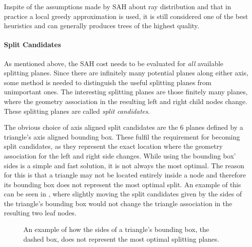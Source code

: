 Inspite of the assumptions made by SAH about ray distribution and that in
practice a local greedy approximation is used, it is still considered one of the
best heuristics and can generally produces trees of the highest quality.



\paragraph{Split Candidates}


As mentioned above, the SAH cost needs to be evaluated for \textit{all}
available splitting planes. Since there are infinitely many potential planes
along either axis, some method is needed to distinguish the useful splitting
planes from unimportant ones. The interesting splitting planes are those
finitely many planes, where the geometry association in the resulting left and
right child nodes change. These splitting planes are called \textit{split
  candidates}.



The obvious choice of axis aligned split candidates are the 6 planes defined by
a triangle's axis aligned bounding box. These fulfil the requirement for
becoming split candidates, as they represent the exact location where the
geometry association for the left and right side changes. While using the
bounding box' sides is a simple and fast solution, it is not always the most
optimal. The reason for this is that a triangle may not be located entirely
inside a node and therefore its bounding box does not represent the most optimal
split. An example of this can be seen in , where slightly
moving the split candidates given by the sides of the triangle's bounding box
would not change the triangle association in the resulting two leaf nodes.

\begin{figure}
  \centering

  \vspace{3mm}
  \parbox{5cm}{\caption[Triangle/Node bounding box intersection.]{An
      example of how the sides of a triangle's bounding box, the
      dashed box, does not represent the most optimal splitting
      planes.}\label{fig:aabbSplit}}
\end{figure}

